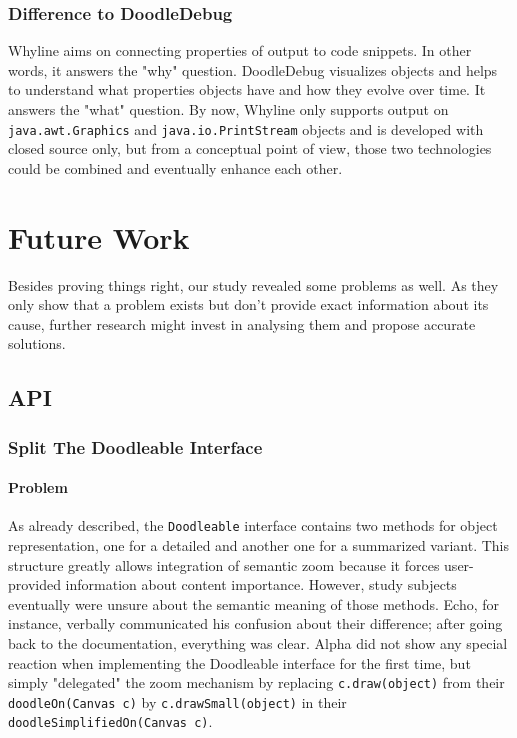 \documentclass[english]{acm_proc_article-sp}
\newcommand{\nb}[2]{\nbc{#1}{#2}{orange}}
\newcommand\todo[1]{\nb{TO DO}{#1}}
\begin{document}
\subsubsection{Difference to DoodleDebug}
Whyline aims on connecting properties of output to code snippets. In other words, it answers the "why" question. DoodleDebug visualizes objects and helps to understand what properties objects have and how they evolve over time. It answers the "what" question. By now, Whyline only supports output on \verb-java.awt.Graphics- and \verb-java.io.PrintStream- objects and is developed with closed source only, but from a conceptual point of view, those two technologies could be combined and eventually enhance each other.

\section{Future Work}

Besides proving things right, our study revealed some problems as well. As they only show that a problem exists but don't provide exact information about its cause, further research might invest in analysing them and propose accurate solutions.

\subsection{API}
\todo{Text}

\subsubsection{Split The Doodleable Interface}
\paragraph{Problem}
As already described, the \verb.Doodleable. interface contains two methods for object representation, one for a detailed and another one for a summarized variant. This structure greatly allows integration of semantic zoom because it forces user-provided information about content importance. However, study subjects eventually were unsure about the semantic meaning of those methods. Echo, for instance, verbally communicated his confusion about their difference; after going back to the documentation, everything was clear. Alpha did not show any special reaction when implementing the Doodleable interface for the first time, but simply "delegated" the zoom mechanism by replacing \verb-c.draw(object)- from their \verb.doodleOn(Canvas c). by \verb-c.drawSmall(object)- in their \verb.doodleSimplifiedOn(Canvas c)..
\end{document}

